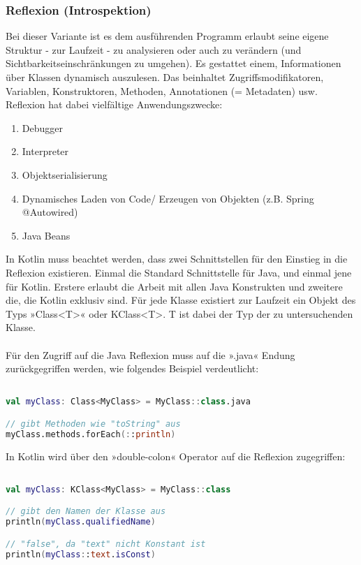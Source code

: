 \subsubsection{Reflexion (Introspektion)}
Bei dieser Variante ist es dem ausführenden Programm erlaubt seine eigene Struktur - zur Laufzeit - zu analysieren oder auch zu verändern (und Sichtbarkeitseinschränkungen zu umgehen). Es gestattet einem, Informationen über Klassen dynamisch auszulesen. Das beinhaltet Zugriffsmodifikatoren, Variablen, Konstruktoren, Methoden, Annotationen (= Metadaten) usw. Reflexion hat dabei vielfältige Anwendungszwecke:
\begin{enumerate}
	\item Debugger
	\item Interpreter
	\item Objektserialisierung
	\item Dynamisches Laden von Code/ Erzeugen von Objekten (z.B. Spring @Autowired)
	\item Java Beans
\end{enumerate}
\bigskip
In Kotlin muss beachtet werden, dass zwei Schnittstellen für den Einstieg in die Reflexion existieren. Einmal die Standard Schnittstelle für Java, und einmal jene für Kotlin. Erstere erlaubt die Arbeit mit allen Java Konstrukten und zweitere die, die Kotlin exklusiv sind. Für jede Klasse existiert zur Laufzeit ein Objekt des Typs »Class<T>« oder KClass<T>. T ist dabei der Typ der zu untersuchenden Klasse.
\\
\\
Für den Zugriff auf die Java Reflexion muss auf die ».java« Endung zurückgegriffen werden, wie folgendes Beispiel verdeutlicht:
\begin{lstlisting}[caption={Java Reflexion}, label={lst:data-class}, language=Kotlin]

val myClass: Class<MyClass> = MyClass::class.java

// gibt Methoden wie "toString" aus
myClass.methods.forEach(::println)
\end{lstlisting}
\bigskip
In Kotlin wird über den »double-colon« Operator auf die Reflexion zugegriffen:
\begin{lstlisting}[caption={Kotlin Reflexion}, label={lst:data-class}, language=Kotlin]

val myClass: KClass<MyClass> = MyClass::class

// gibt den Namen der Klasse aus
println(myClass.qualifiedName)

// "false", da "text" nicht Konstant ist
println(myClass::text.isConst)
\end{lstlisting}
